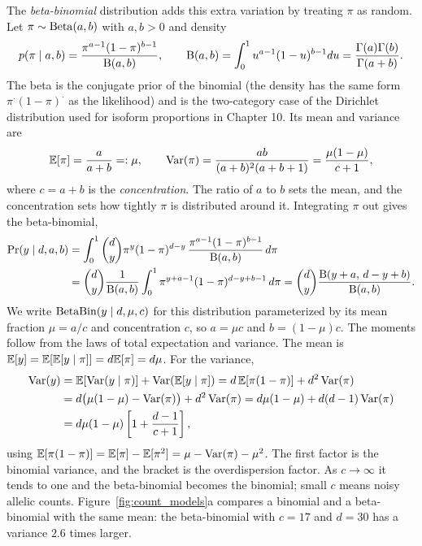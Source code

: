 The \emph{beta-binomial} distribution adds this extra variation by treating $\pi$ as random. Let $\pi\sim\operatorname{Beta}(a,b)$ with $a,b>0$ and density
\begin{equation}
  p(\pi\mid a,b) = \frac{\pi^{a-1}(1-\pi)^{b-1}}{\mathrm{B}(a,b)}, \qquad \mathrm{B}(a,b)=\int_0^1 u^{a-1}(1-u)^{b-1}du = \frac{\Gamma(a)\Gamma(b)}{\Gamma(a+b)}.
\end{equation}
The beta is the conjugate prior of the binomial (the density has the same form $\pi^{\cdot}(1-\pi)^{\cdot}$ as the likelihood) and is the two-category case of the Dirichlet distribution used for isoform proportions in Chapter 10. Its mean and variance are
\begin{equation}
  \mathbb{E}[\pi] = \frac{a}{a+b}=:\mu, \qquad \operatorname{Var}(\pi) = \frac{ab}{(a+b)^2(a+b+1)} = \frac{\mu(1-\mu)}{c+1},
\end{equation}
where $c=a+b$ is the \emph{concentration}. The ratio of $a$ to $b$ sets the mean, and the concentration sets how tightly $\pi$ is distributed around it. Integrating $\pi$ out gives the beta-binomial,
\begin{align}
  \Pr(y\mid d,a,b) &= \int_0^1\binom{d}{y}\pi^y(1-\pi)^{d-y}\,\frac{\pi^{a-1}(1-\pi)^{b-1}}{\mathrm{B}(a,b)}\,d\pi \nonumber\\
  &= \binom{d}{y}\frac{1}{\mathrm{B}(a,b)}\int_0^1\pi^{y+a-1}(1-\pi)^{d-y+b-1}\,d\pi
  = \binom{d}{y}\frac{\mathrm{B}(y+a,\,d-y+b)}{\mathrm{B}(a,b)}.
  \label{eq:betabinom}
\end{align}
We write $\operatorname{BetaBin}(y\mid d,\mu,c)$ for this distribution parameterized by its mean fraction $\mu=a/c$ and concentration $c$, so $a=\mu c$ and $b=(1-\mu)c$. The moments follow from the laws of total expectation and variance. The mean is $\mathbb{E}[y]=\mathbb{E}[\mathbb{E}[y\mid\pi]]=d\mathbb{E}[\pi]=d\mu$. For the variance,
\begin{align}
  \operatorname{Var}(y) &= \mathbb{E}[\operatorname{Var}(y\mid\pi)] + \operatorname{Var}(\mathbb{E}[y\mid\pi]) = d\,\mathbb{E}[\pi(1-\pi)] + d^2\operatorname{Var}(\pi) \nonumber\\
  &= d\big(\mu(1-\mu)-\operatorname{Var}(\pi)\big) + d^2\operatorname{Var}(\pi) = d\mu(1-\mu) + d(d-1)\operatorname{Var}(\pi) \nonumber\\
  &= d\mu(1-\mu)\left[1+\frac{d-1}{c+1}\right],
\end{align}
using $\mathbb{E}[\pi(1-\pi)]=\mathbb{E}[\pi]-\mathbb{E}[\pi^2]=\mu-\operatorname{Var}(\pi)-\mu^2$. The first factor is the binomial variance, and the bracket is the overdispersion factor. As $c\to\infty$ it tends to one and the beta-binomial becomes the binomial; small $c$ means noisy allelic counts. Figure~\ref{fig:count_models}a compares a binomial and a beta-binomial with the same mean: the beta-binomial with $c=17$ and $d=30$ has a variance $2.6$ times larger.

